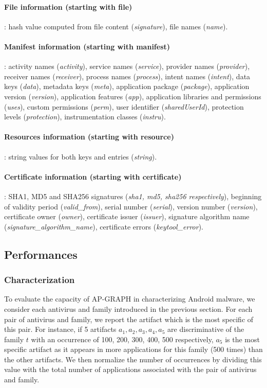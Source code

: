 \paragraph{File information (starting with file)}: hash value computed from file content (\textit{signature}), file names (\textit{name}).

\paragraph{Manifest information (starting with manifest)}: activity names (\textit{activity}), service names (\textit{service}), provider names (\textit{provider}), receiver names (\textit{receiver}), process names (\textit{process}), intent names (\textit{intent}), data keys (\textit{data}), metadata keys (\textit{meta}), application package (\textit{package}), application version (\textit{version}), application features (\textit{app}), application libraries and permissions (\textit{uses}), custom permissions (\textit{perm}), user identifier (\textit{sharedUserId}), protection levels (\textit{protection}), instrumentation classes (\textit{instru}).

\paragraph{Resources information (starting with resource)}: string values for both keys and entries (\textit{string}).

\paragraph{Certificate information (starting with certificate)}: SHA1, MD5 and SHA256 signatures (\textit{sha1, md5, sha256 respectively}), beginning of validity period (\textit{valid\_from}), serial number (\textit{serial}), version number (\textit{version}), certificate owner (\textit{owner}), certificate issuer (\textit{issuer}), signature algorithm name (\textit{signature\_algorithm\_name}), certificate errors (\textit{keytool\_error}).
\subsection{Performances}
\subsubsection{Characterization}
To evaluate the capacity of AP-GRAPH in characterizing Android malware, we consider each antivirus and family introduced in the previous section.
For each pair of antivirus and family, we report the artifact which is the most specific of this pair.
For instance, if 5 artifacts $\mathit{a}_1, \mathit{a}_2 ,\mathit{a}_3 ,\mathit{a}_4 ,\mathit{a}_5$ are discriminative of the family $\mathit{t}$ with an occurrence of 100, 200, 300, 400, 500 respectively, $\mathit{a}_5$ is the most specific artifact as it appears in more applications for this family (500 times) than the other artifacts.
We then normalize the number of occurrences by dividing this value with the total number of applications associated with the pair of antivirus and family.

